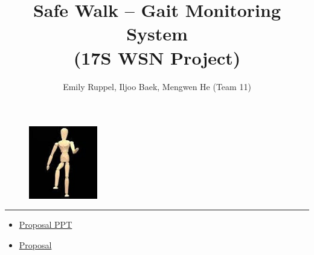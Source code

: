 \documentclass[letterpaper,12pt]{article}
\title{\textbf{Safe Walk -- Gait Monitoring System\\\small (17S WSN Project)}}
\author{Emily Ruppel, Iljoo Baek, Mengwen He (Team 11)}
\newcommand{\panhline}{\begin{center}\rule{\textwidth}{1pt}\end{center}}
\begin{document}
\maketitle

\begin{figure}[!h]
	\centering
	\includegraphics[width=3cm]{./imgs/marven.jpg}
\end{figure}

\panhline
\begin{itemize}
	\item \href{./PDFs/GaitMonitoring_Feb-24-17_v0.1.pdf}{Proposal PPT}
	\item \href{./PDFs/proposal_grp11.pdf}{Proposal}
\end{itemize}
	
\end{document}
